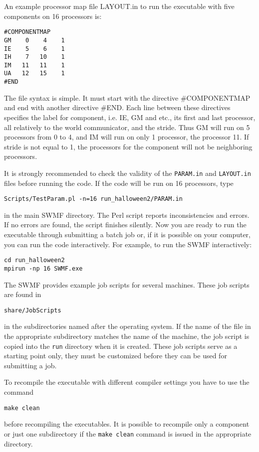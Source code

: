 An example processor map file LAYOUT.in to run the executable with
five components on 16 processors is:
\begin{verbatim}
#COMPONENTMAP
GM    0    4    1
IE    5    6    1
IH    7   10    1
IM   11   11    1
UA   12   15    1
#END
\end{verbatim}
The file syntax is simple. It must start with the directive
\#COMPONENTMAP and end with another directive \#END. Each line between
these directives specifies the label for component, i.e. IE, GM and
etc., its first and last processor, all relatively to the world
communicator, and the stride. Thus GM will run on 5 processors from 0
to 4, and IM will run on only 1 processor, the processor 11.  If
stride is not equal to 1, the processors for the component will not be
neighboring processors.

It is strongly recommended to check the validity of the {\tt PARAM.in} and 
{\tt LAYOUT.in} files before running the code. If the
code will be run on 16 processors, type
\begin{verbatim}
Scripts/TestParam.pl -n=16 run_halloween2/PARAM.in
\end{verbatim}
in the main SWMF directory.
The Perl script reports inconsistencies and errors. 
If no errors are found, the script finishes silently.
Now you are ready to run the executable through submitting a batch job or, 
if it is possible on your computer, you can run the code interactively.  For
example, to run the SWMF interactively:
\begin{verbatim}
cd run_halloween2
mpirun -np 16 SWMF.exe
\end{verbatim}
The SWMF provides example job scripts for several machines. 
These job scripts are found in 
\begin{verbatim}
share/JobScripts
\end{verbatim}
in the subdirectories named after the operating system. If the name
of the file in the appropriate subdirectory matches the 
name of the machine, the job script is copied into
the {\tt run} directory when it is created.
These job scripts serve as a starting point only, they must
be customized before they can be used for submitting a job.

To recompile the executable with different compiler settings you have
to use the command
\begin{verbatim}
make clean
\end{verbatim}
before recompiling the executables. It is possible to recompile
only a component or just one subdirectory if the {\tt make clean}
command is issued in the appropriate directory.

